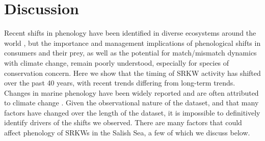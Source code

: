 \documentclass{article}
\begin{document}
\section*{Discussion}
\par Recent shifts in phenology have been identified in diverse ecosystems around the world \citep{poloczanska2013}, but the importance and management implications of phenological shifts in consumers and their prey, as well as the potential for match/mismatch dynamics with climate change, remain poorly understood, especially for species of conservation concern. Here we show that the timing of SRKW activity has shifted over the past 40 years, with recent trends differing from long-term trends. Changes in marine phenology have been widely reported and are often attributed to climate change \citep{poloczanska2013}. Given the observational nature of the dataset, and that many factors have changed over the length of the dataset, it is impossible to definitively identify drivers of the shifts we observed. There are many factors that could affect phenology of SRKWs in the Salish Sea, a few of which we discuss below.
\end{document}
